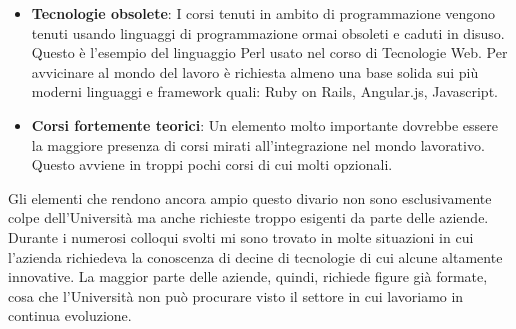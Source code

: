 \begin{itemize}
	\item \textbf{Tecnologie obsolete}: I corsi tenuti in ambito di programmazione vengono tenuti usando linguaggi di programmazione ormai obsoleti e caduti in disuso. Questo \`e l'esempio del linguaggio Perl usato nel corso di Tecnologie Web. Per avvicinare al mondo del lavoro \`e richiesta almeno una base solida sui pi\`u moderni linguaggi e framework quali: Ruby on Rails, Angular.js, Javascript.
	
	\item \textbf{Corsi fortemente teorici}: Un elemento molto importante dovrebbe essere la maggiore presenza di corsi mirati all'integrazione nel mondo lavorativo. Questo avviene in troppi pochi corsi di cui molti opzionali.
\end{itemize}
\noindent
Gli elementi che rendono ancora ampio questo divario non sono esclusivamente colpe dell'Universit\`a ma anche richieste troppo esigenti da parte delle aziende.\\
Durante i numerosi colloqui svolti mi sono trovato in molte situazioni in cui l'azienda richiedeva la conoscenza di decine di tecnologie di cui alcune altamente innovative. La maggior parte delle aziende, quindi, richiede figure gi\`a formate, cosa che l'Universit\`a non pu\`o procurare visto il settore in cui lavoriamo in continua evoluzione.  
\newpage
